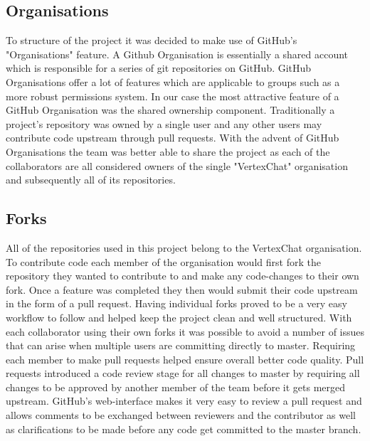 \subsection{Organisations}
To structure of the project it was decided to make use of GitHub's "Organisations" feature. A Github Organisation is
essentially a shared account which is responsible for a series of git repositories on GitHub. GitHub Organisations offer a lot of features which are applicable to groups such as a more robust permissions system. In our case the most attractive feature of a GitHub Organisation was the shared ownership component. Traditionally a project's repository was owned by a single user and any other users may contribute code upstream through pull requests. With the advent of GitHub Organisations the team was better able to share the project as each of the collaborators are all considered owners of the single "VertexChat" organisation and subsequently all of its repositories.

\subsection{Forks}
All of the repositories used in this project belong to the VertexChat organisation. To contribute code each member of
the organisation would first fork the repository they wanted to contribute to and make any code-changes to their own fork. Once a feature was completed they then would submit their code upstream in the form of a pull request. Having individual forks proved to be a very easy workflow to follow and helped keep the project clean and well structured. With each collaborator using their own forks it was possible to avoid a number of issues that can arise when multiple users are committing directly to master. Requiring each member to make pull requests helped ensure overall better code quality.  Pull requests introduced a code review stage for all changes to master by requiring all changes to be approved by another member of the team before it gets merged upstream. GitHub's web-interface makes it very easy to review a pull request and allows comments to be exchanged between reviewers and the contributor as well as clarifications to be made before any code get committed to the master branch.

